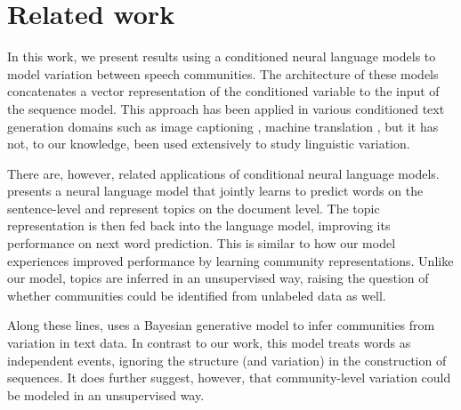 \documentclass[11pt,a4paper]{article}
\begin{document}


\section{Related work}

In this work, we present results using a conditioned neural language models
to model variation between speech communities.
The architecture of these models concatenates a vector representation
of the conditioned variable to the input of the sequence model.
This approach has been applied in various conditioned text generation domains such as 
image captioning \citep{Vinyals2015}, machine translation \citep{Kalchbrenner2013},
but it has not, to our knowledge, been used extensively to study linguistic variation.

There are, however, related applications of conditional neural language models.
\citet{Lau2017a} presents a neural language model that jointly learns to predict
words on the sentence-level and represent topics on the document level.
The topic representation is then fed back into the language model, 
improving its performance on next word prediction.
This is similar to how our model experiences improved performance
by learning community representations. 
Unlike our model, topics are inferred in an unsupervised way, 
raising the question of whether communities could be identified from 
unlabeled data as well.

Along these lines, \citet{OConnor2010} uses a Bayesian generative
model to infer communities from variation in text data.  In contrast
to our work, this model treats words as independent events, ignoring
the structure (and variation) in the construction of sequences.  It
does further suggest, however, that community-level variation could be
modeled in an unsupervised way.
\end{document}
